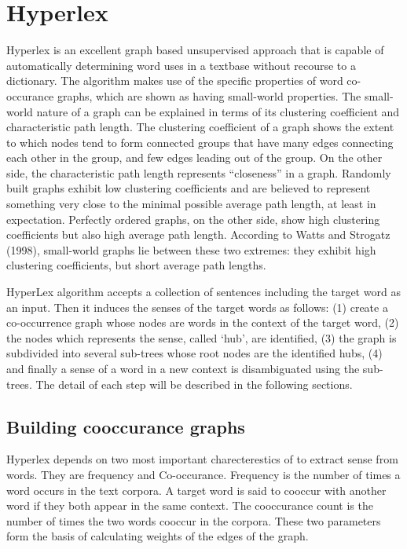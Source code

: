 \documentclass[article,dr=phil,type=drfinal,colorback,accentcolor=tud9c]{tudthesis}
\begin{document}
\newpage
\section{Hyperlex}
Hyperlex is an excellent graph based unsupervised approach that is capable of automatically determining word uses in a textbase without recourse to a dictionary. The algorithm makes use of the specific properties of word co-occurance graphs, which are shown as having small-world properties. The small-world nature of a graph can be explained in terms of its clustering coefficient and characteristic path length. The clustering coefficient of a graph shows the extent to which nodes tend to form connected groups that have many edges connecting each other in the group, and few edges leading out of the group. On the other side, the characteristic path length represents “closeness” in a graph. Randomly built graphs exhibit low clustering coefficients and are believed to represent something very close to the minimal possible average path length, at least in expectation. Perfectly ordered graphs, on the other side, show high clustering coefficients but also high average path length. According to Watts and Strogatz (1998), small-world graphs lie between these two extremes: they exhibit high clustering coefficients, but short average path lengths.

HyperLex algorithm accepts a collection of sentences including the target word as an input. Then
it induces the senses of the target words as follows: (1) create a co-occurrence graph whose
nodes are words in the context of the target word, (2) the nodes which
represents the sense, called ‘hub’, are identified, (3) the graph is subdivided into several
sub-trees whose root nodes are the identified hubs, (4) and finally a sense of a word in a new context is disambiguated using the sub-trees. The detail of each step will be described in the
following sections.

\subsection{Building cooccurance graphs}

Hyperlex depends on two most important charecterestics of to extract sense from words. They are frequency and Co-occurance. Frequency is the number of times a word occurs in the text corpora. A target word is said to cooccur with another word if they both appear in the same context. The cooccurance count is the number of times the two words cooccur in the corpora. These two parameters form the basis of calculating weights of the edges of the graph. 
\end{document}
